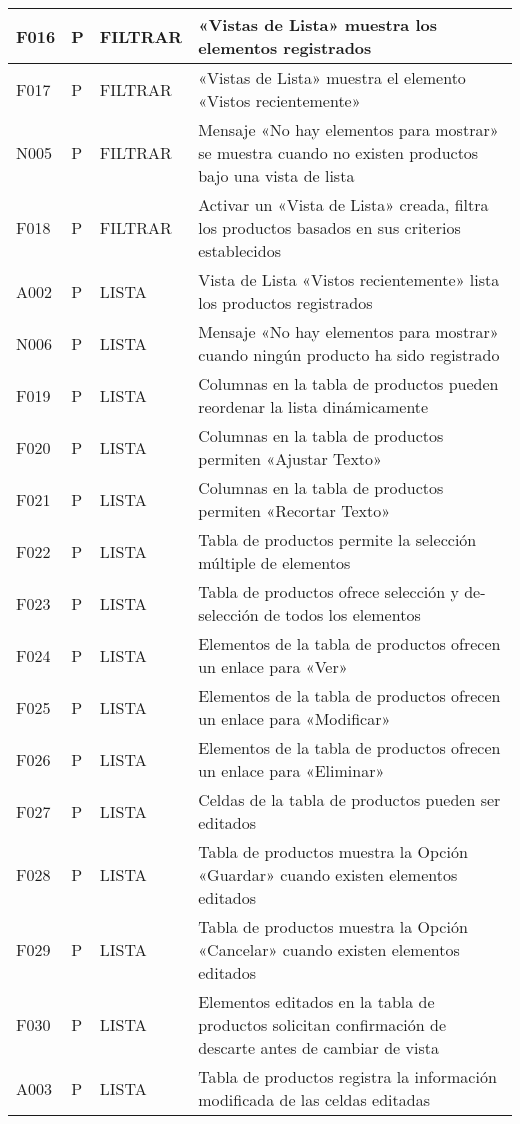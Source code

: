 \begin{landscape}
\begin{longtable}[htb]{|l|l|p{5.0cm}|p{13.0cm}|}
F016 & P & FILTRAR & «Vistas de Lista» muestra los elementos registrados \\ \hline
F017 & P & FILTRAR & «Vistas de Lista» muestra el elemento «Vistos recientemente» \\ \hline
N005 & P & FILTRAR & Mensaje «No hay elementos para mostrar» se muestra cuando no existen productos bajo una vista de lista \\ \hline
F018 & P & FILTRAR & Activar un «Vista de Lista» creada, filtra los productos basados en sus criterios establecidos \\ \hline
A002 & P & LISTA & Vista de Lista «Vistos recientemente» lista los productos registrados \\ \hline
N006 & P & LISTA & Mensaje «No hay elementos para mostrar» cuando ningún producto ha sido registrado \\ \hline
F019 & P & LISTA & Columnas en la tabla de productos pueden reordenar la lista dinámicamente \\ \hline
F020 & P & LISTA & Columnas en la tabla de productos permiten «Ajustar Texto» \\ \hline
F021 & P & LISTA & Columnas en la tabla de productos permiten «Recortar Texto» \\ \hline
F022 & P & LISTA & Tabla de productos permite la selección múltiple de elementos \\ \hline
F023 & P & LISTA & Tabla de productos ofrece selección y de-selección de todos los elementos \\ \hline
F024 & P & LISTA & Elementos de la tabla de productos ofrecen un enlace para «Ver» \\ \hline
F025 & P & LISTA & Elementos de la tabla de productos ofrecen un enlace para «Modificar» \\ \hline
F026 & P & LISTA & Elementos de la tabla de productos ofrecen un enlace para «Eliminar» \\ \hline
F027 & P & LISTA & Celdas de la tabla de productos pueden ser editados \\ \hline
F028 & P & LISTA & Tabla de productos muestra la Opción «Guardar» cuando existen elementos editados \\ \hline
F029 & P & LISTA & Tabla de productos muestra la Opción «Cancelar» cuando existen elementos editados \\ \hline
F030 & P & LISTA & Elementos editados en la tabla de productos solicitan confirmación de descarte antes de cambiar de vista \\ \hline
A003 & P & LISTA & Tabla de productos registra la información modificada de las celdas editadas \\ \hline

\end{longtable}
\end{landscape}
